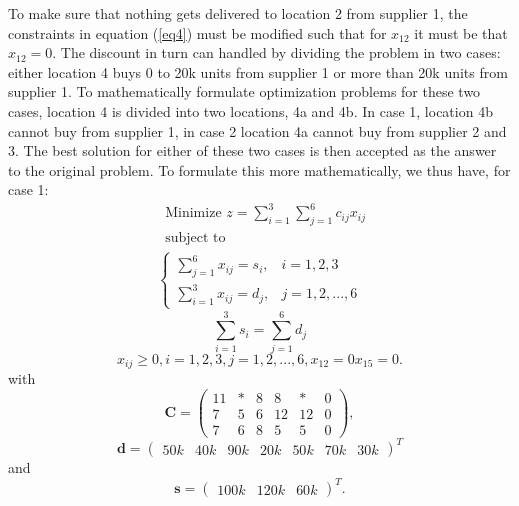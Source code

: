 \documentclass{article}
\begin{document}
  \noindent
  To make sure that nothing gets delivered to location 2 from supplier 1, the constraints in equation (\ref{eq4}) must be modified such that for $x_{12}$ it must be that $x_{12} = 0$. The discount in turn can handled by dividing the problem in two cases: either location 4 buys 0 to 20k units from supplier 1 or more than 20k units from supplier 1. To mathematically formulate optimization problems for these two cases, location 4 is divided into two locations, 4a and 4b. In case 1, location 4b cannot buy from supplier 1, in case 2 location 4a cannot buy from supplier 2 and 3. The best solution for either of these two cases is then accepted as the answer to the original problem. To formulate this more mathematically, we thus have, for case 1:
  \begin{align*}
  & \text{Minimize } z = \sum_{i=1}^{3}\sum_{j=1}^6 c_{ij}x_{ij} \\
  & \text{subject to}
    \label{eq10}
  \end{align*}
  \begin{align}
    \begin{cases}
      \sum_{j=1}^{6} x_{ij} = s_{i}, & i = 1, 2, 3 \\
      \sum_{i=1}^{3} x_{ij} = d_{j}, & j = 1, 2, ..., 6
    \end{cases}
  \end{align}
  \begin{equation}
    \sum_{i=1}^{3} s_{i} = \sum_{j=1}^6 d_{j}
    \label{eq12}
  \end{equation}
  \begin{equation}
    x_{ij} \geq 0, i = 1, 2, 3, j = 1, 2, ..., 6, x_{12} = 0 x_{15} = 0.
    \label{eq13}
  \end{equation}
  with
  \begin{equation}
    \mathbf{C} = 
    \begin{pmatrix}
      11 & * & 8 & 8  & *  & 0\\
      7  & 5 & 6 & 12 & 12 & 0\\
      7  & 6 & 8 & 5  & 5  & 0
    \end{pmatrix},
    \label{eq14}
  \end{equation}
  \begin{equation}
    \mathbf{d} =
    \begin{pmatrix}
      50k & 40k & 90k & 20k & 50k & 70k & 30k
    \end{pmatrix}^T
    \label{eq15}
  \end{equation}
  and
  \begin{equation}
    \mathbf{s} =
    \begin{pmatrix}
      100k & 120k & 60k
    \end{pmatrix}^T.
    \label{eq16}
  \end{equation}
\end{document}
